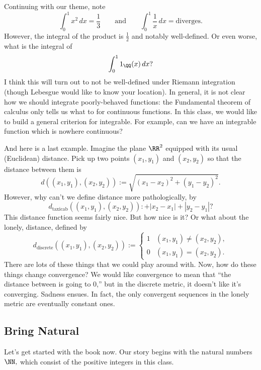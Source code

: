 \documentclass[../notes.tex]{subfiles}
\begin{document}
Continuing with our theme, note
\[\int_0^1x^2\,dx=\frac13\qquad\text{and}\qquad\int_0^1\frac1x\,dx=\text{diverges}.\]
However, the integral of the product is $\frac12$ and notably well-defined. Or even worse, what is the integral of
\[\int_0^11_{\QQ}(x)\,dx?\]
I think this will turn out to not be well-defined under Riemann integration (though Lebesgue would like to know your location). In general, it is not clear how we should integrate poorly-behaved functions: the Fundamental theorem of calculus only tells us what to for continuous functions. In this class, we would like to build a general criterion for integrable. For example, can we have an integrable function which is nowhere continuous?

And here is a last example. Imagine the plane $\RR^2$ equipped with its usual (Euclidean) distance. Pick up two points $(x_1,y_1)$ and $(x_2,y_2)$ so that the distance between them is
\[d((x_1,y_1),(x_2,y_2)):=\sqrt{(x_1-x_2)^2+(y_1-y_2)^2}.\]
However, why can't we define distance more pathologically, by
\[d_{\text{taxicab}}((x_1,y_1),(x_2,y_2)):+|x_2-x_1|+|y_2-y_1|?\]
This distance function seems fairly nice. But how nice is it? Or what about the lonely, distance, defined by
\[d_{\text{discrete}}((x_1,y_1),(x_2,y_2)):=\begin{cases}
	1 & (x_1,y_1)\ne(x_2,y_2), \\
	0 & (x_1,y_1)=(x_2,y_2).
\end{cases}\]
There are lots of these things that we could play around with. Now, how do these things change convergence? We would like convergence to mean that ``the distance between is going to $0$,'' but in the discrete metric, it doesn't like it's converging. Sadness ensues. In fact, the only convergent sequences in the lonely metric are eventually constant ones.

\subsection{Bring Natural}
Let's get started with the book now. Our story begins with the natural numbers $\NN,$ which consist of the positive integers in this class.
\end{document}
